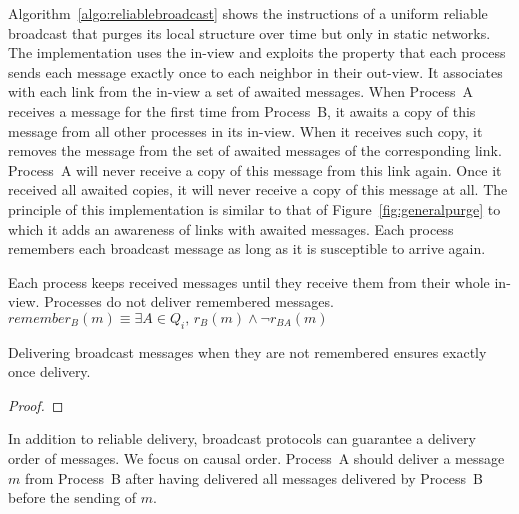 Algorithm~\ref{algo:reliablebroadcast} shows the instructions of a uniform
reliable broadcast that purges its local structure over time but only in static
networks. The implementation uses the in-view and exploits the property that
each process sends each message exactly once to each neighbor in their
out-view. 
It associates with each link from the in-view a set of awaited messages. When
Process~A receives a message for the first time from Process~B, it awaits a copy
of this message from all other processes in its in-view. When it receives such
copy, it removes the message from the set of awaited messages of the
corresponding link. Process~A will never receive a copy of this message from
this link again. Once it received all awaited copies, it will never receive a
copy of this message at all. The principle of this implementation is similar to
that of Figure~\ref{fig:generalpurge} to which it adds an awareness of links
with awaited messages. Each process remembers each broadcast message as long as
it is susceptible to arrive again.

\begin{definition}[Remember]
  Each process keeps received messages until they receive them from their whole
  in-view. Processes do not deliver remembered messages.
  $remember_B(m) \equiv \exists A \in Q_i,\, r_B(m) \wedge \neg r_{BA}(m)$
\end{definition}

\begin{theorem}
   Delivering broadcast messages when they
  are not remembered ensures exactly once delivery.
\end{theorem}

\begin{proof}
\end{proof}


In addition to reliable delivery, broadcast protocols can guarantee a delivery
order of messages. We focus on causal order. Process~A should deliver a message
$m$ from Process~B after having delivered all messages delivered by Process~B
before the sending of $m$.

